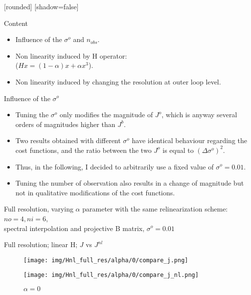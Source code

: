 \documentclass[francais]{beamer}
\title[Nicolas Baillot d'Etivaux]{}
\begin{document}
[rounded]%
[shadow=false]


\begin{frame}{Content}
\begin{itemize}
\item Influence of the $\sigma^o$ and $n_{obs}$.
\item Non linearity induced by H operator:\\
($Hx = (1-\alpha) x+ \alpha x^3$).
\item Non linearity induced by changing the resolution at outer loop level.
\end{itemize}
\end{frame}


\begin{frame}{Influence of the $\sigma^o$}
\begin{itemize}
\item Tuning the $\sigma^o$ only modifies the magnitude of $J^o$, which is anyway several orders of magnitudes higher than $J^b$.\\
\item Two results obtained with different $\sigma^o$ have identical behaviour regarding the cost functions, and the ratio between the two $J^o$ is equal to ${(\Delta \sigma^o)}^2$.
\item Thus, in the following, I decided to arbitrarily use a fixed value of $\sigma^o = 0.01$.
\item Tuning the number of observation also results in a change of magnitude but not in qualitative modifications of the cost functions.
\end{itemize}
\end{frame}


\begin{frame}
\begin{center}
\large{Full resolution, varying $\alpha$ parameter with the same relinearization scheme: $no=4, ni=6$,\\
spectral interpolation and projective B matrix,
$\sigma^o=0.01$}
\end{center}
\end{frame}

\begin{frame}{Full resolution; linear H; $J$ vs $J^{nl}$}
\begin{center}
\begin{figure}
  \texttt{[image: img/Hnl\_full\_res/alpha/0/compare\_j.png]}
  \caption{$\alpha = 0$}
\endminipage\hfill
{}
  \texttt{[image: img/Hnl\_full\_res/alpha/0/compare\_j\_nl.png]}
  \caption{$\alpha = 0$}
\endminipage
\end{figure}
\end{center}
\end{frame}
\end{document}
